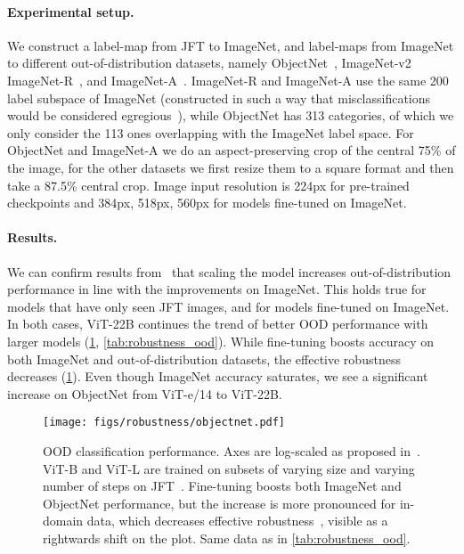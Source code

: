 \documentclass{article}
\newcommand{\chonk}{\mbox{ViT-22B}\xspace}
\begin{document}
\paragraph{Experimental setup.} We construct a label-map from JFT to ImageNet, and label-maps from ImageNet to different out-of-distribution datasets, namely ObjectNet~\citep{barbu2019objectnet}, ImageNet-v2~\citep{recht2019imagenet_v2} ImageNet-R~\citep{hendrycks2020imagenet_r}, and ImageNet-A~\citep{hendrycks2021imagenet_a}. ImageNet-R and ImageNet-A use the same 200 label subspace of ImageNet (constructed in such a way that misclassifications would be considered egregious~\citep{hendrycks2021imagenet_a}), while ObjectNet has 313 categories, of which we only consider the 113 ones overlapping with the ImageNet label space. For ObjectNet and ImageNet-A we do an aspect-preserving crop of the central 75\% of the image, for the other datasets we first resize them to a square format and then take a 87.5\% central crop. Image input resolution is 224px for pre-trained checkpoints and 384px, 518px, 560px for models fine-tuned on ImageNet.

\paragraph{Results.} We can confirm results from~\citep{taori2020measuring_robustness,djolonga2021robustness_transferability,kolesnikov2020big} that scaling the model increases out-of-distribution performance in line with the improvements on ImageNet. This holds true for models that have only seen JFT images, and for models fine-tuned on ImageNet. In both cases,  \chonk continues the trend of better OOD performance with larger models (\cref{fig:robustness_objectnet}, \cref{tab:robustness_ood}).
While fine-tuning boosts accuracy on both ImageNet and out-of-distribution datasets, the effective robustness~\citep{andreassen2021effective_robustness} decreases (\cref{fig:robustness_objectnet}).
Even though ImageNet accuracy saturates, we see a significant increase on ObjectNet from ViT-e/14 to \chonk.

\begin{figure}[tbp]
    \centering
\texttt{[image: figs/robustness/objectnet.pdf]}
\caption{
        OOD classification performance. Axes are log-scaled as proposed in~\citep{taori2020measuring_robustness}. ViT-B and ViT-L are trained on subsets of varying size and varying number of steps on JFT~\citep{zhai2022scaling}. Fine-tuning boosts both ImageNet and ObjectNet performance, but the increase is more pronounced for in-domain data, which decreases effective robustness~\citep{andreassen2021effective_robustness}, visible as a rightwards shift on the plot. Same data as in \cref{tab:robustness_ood}.
    }
    \label{fig:robustness_objectnet}
\end{figure}
\end{document}
